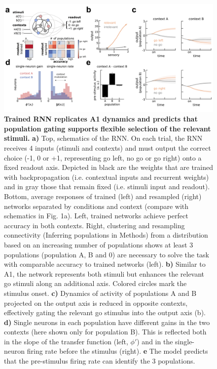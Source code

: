 \documentclass[12pt]{article}
\begin{document}
\begin{figure}
\centering
        \includegraphics[width=\textwidth]{figures/Fig2.pdf}
    \caption{\textbf{Trained RNN replicates A1 dynamics and predicts that population gating supports flexible selection of the relevant stimuli.} \textbf{a)} Top, schematics of the RNN. On each trial, the RNN receives 4 inputs (stimuli and contexts) and must output the correct choice (-1, 0 or +1, representing go left, no go or go right) onto a fixed readout axis. Depicted in black are the weights that are trained with backpropagation (i.e. contextual inputs and recurrent weights) and in gray those that remain fixed (i.e. stimuli input and readout). Bottom, average responses of trained (left) and resampled (right) networks separated by conditions and context (compare with schematics in Fig. 1a). Left, trained networks achieve perfect accuracy in both contexts. Right, clustering and resampling connectivity (Inferring populations in Methods) from a distribution based on an increasing number of populations shows at least 3 populations (population A, B and 0) are necessary to solve the task with comparable accuracy to trained networks (left). \textbf{b)} Similar to A1, the network represents both stimuli but enhances the relevant go stimuli along an additional axis. Colored circles mark the stimulus onset. \textbf{c)} Dynamics of activity of populations A and B projected on the output axis is reduced in opposite contexts, effectively gating the relevant go stimulus into the output axis (b). \textbf{d)} Single neurons in each population have different gains in the two contexts (here shown only for population B). This is reflected both in the slope of the transfer function (left,  $\phi'$) and in the single-neuron firing rate before the stimulus (right). \textbf{e} The model predicts that the pre-stimulus firing rate can identify the 3 populations. } 
    \label{fig2}
\end{figure}
\end{document}
